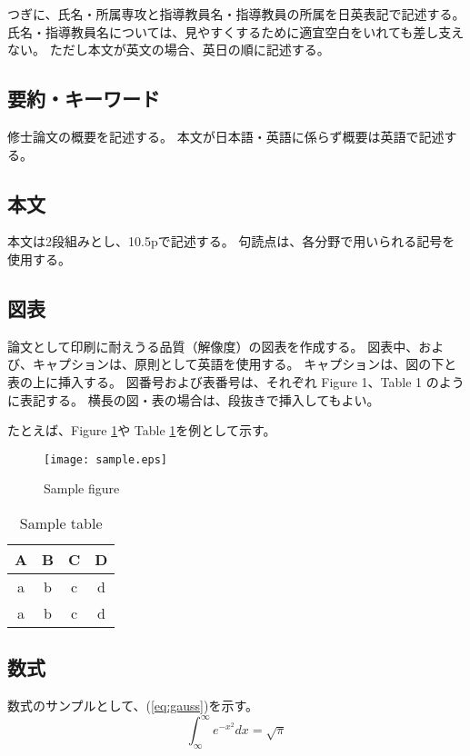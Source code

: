 \documentclass[11pt,twocolumn]{jarticle} %
\begin{document}
つぎに、氏名・所属専攻と指導教員名・指導教員の所属を日英表記で記述する。
氏名・指導教員名については、見やすくするために適宜空白をいれても差し支えない。
ただし本文が英文の場合、英日の順に記述する。


\subsection{要約・キーワード}
修士論文の概要を記述する。
本文が日本語・英語に係らず概要は英語で記述する。


\subsection{本文}
本文は2段組みとし、10.5pで記述する。
句読点は、各分野で用いられる記号を使用する。

\subsection{図表}
論文として印刷に耐えうる品質（解像度）の図表を作成する。
図表中、および、キャプションは、原則として英語を使用する。
キャプションは、図の下と表の上に挿入する。
図番号および表番号は、それぞれ Figure 1、Table 1 のように表記する。
横長の図・表の場合は、段抜きで挿入してもよい。

たとえば、Figure \ref{fig:samplefigure}や Table \ref{tbl:sampletable}を例として示す。

\begin{figure}[t]
 \begin{center}
  \texttt{[image: sample.eps]}
  \caption{Sample figure}\label{fig:samplefigure}
 \end{center}
\end{figure}

\begin{table}
 \caption{Sample table} \label{tbl:sampletable}
\begin{center}
  \begin{tabular}{c|ccc}
  A & B & C & D\\
  \hline \hline
  a & b & c & d\\
  a & b & c & d\\ \hline
 \end{tabular}
\end{center}
\end{table}

\subsection{数式}
数式のサンプルとして、(\ref{eq:gauss})を示す。
\begin{equation}
 \int _\infty ^\infty e^{-x^2}dx = \sqrt{\pi} \label{eq:gauss}
\end{equation}
\end{document}
